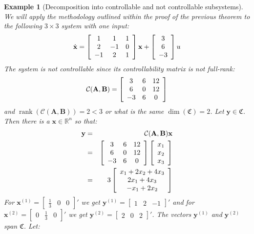 \documentclass[a4paper,10pt,oneside]{book}
\newtheorem{example}{Example}
\begin{document}
\begin{example}[Decomposition into controllable and not controllable subsystems]
We will apply the methodology outlined within the proof of the previous theorem to the following $3\times 3$ system with one input:
\begin{equation}
 \dot{\mathbf{x}}=\left[ {\begin{array}{*{3}c}
1 & 1 & 1\\
2 & -1 & 0\\
-1 & 2 & 1
 \end{array} } \right]\mathbf{x} +
\left[ {\begin{array}{c}
3\\
6\\
-3
 \end{array} } \right]u
\end{equation}
 The system is not controllable since its controllability matrix is not full-rank:
\begin{equation}
 \mathcal{C}(\mathbf{A},\mathbf{B})=\left[ {\begin{array}{*{3}c}
3 & 6 & 12\\
6 & 0 & 12\\
-3 & 6 & 0
 \end{array} } \right]
\end{equation}
and $\operatorname{rank}(\mathcal{C}(\mathbf{A},\mathbf{B}))=2<3$ or what is the same $\operatorname{dim}(\mathfrak{C})=2$. Let $\mathbf{y}\in\mathfrak{C}$. Then there is a $\mathbf{x}\in\mathbb{R}^n$ so that:
\begin{eqnarray}
 \mathbf{y}&=&\mathcal{C}(\mathbf{A},\mathbf{B})\mathbf{x}\\
&=&\left[ {\begin{array}{*{3}c}
3 & 6 & 12\\
6 & 0 & 12\\
-3 & 6 & 0
 \end{array} } \right]\left[ {\begin{array}{c}
x_1\\
x_2\\
x_3
 \end{array} } \right]\\
&=&3\left[ {\begin{array}{c}
x_1+2x_2+4x_3\\
2x_1+4x_3\\
-x_1+2x_2
 \end{array} } \right]
\end{eqnarray}
For $\mathbf{x}^{(1)}=\left[{\begin{array}{ccc}\frac{1}{3}&0&0\end{array}}\right]'$ we get $\mathbf{y}^{(1)}=\left[{\begin{array}{ccc}1&2&-1\end{array}}\right]'$ and for $\mathbf{x}^{(2)}=\left[{\begin{array}{ccc}0&\frac{1}{3}&0\end{array}}\right]'$ we get $\mathbf{y}^{(2)}=\left[{\begin{array}{ccc}2&0&2\end{array}}\right]'$. The vectors $\mathbf{y}^{(1)}$ and $\mathbf{y}^{(2)}$ span $\mathfrak{C}$. Let:

\end{example}
\end{document}
